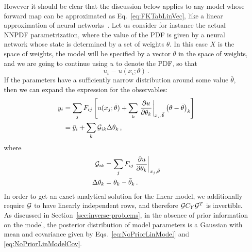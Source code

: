 However it should be clear that the discussion below applies to any model whose forward 
map can be approximated as Eq.~\eqref{eq:FKTabLinVec}, like a linear approximation of neural
networks~\cite{ADVANI2020428}. Let us consider for instance the actual NNPDF parametrization, 
where the value of the PDF is given by a neural network whose state is determined by a set of 
weights $\theta$. In this case $X$ is the space of weights, the model will be specified by a vector 
$\theta$ in the space of weights, and we are going to continue using $u$ to denote the PDF, so that 
\begin{equation}
    \label{eq:WeightsParam}
    u_i = u(x_i; \theta)\, .
\end{equation}
If the parameters have a sufficiently narrow distribution around some value $\bar\theta$, then
we can expand the expression for the observables:
\begin{align}
    y_i  &= 
        \sum_j F_{ij} \left[u(x_j; \bar\theta)
         + \sum_k \left.\frac{\partial u}{\partial \theta_k}\right|_{x_j,\bar\theta} 
         \left(\theta - \bar\theta\right)_k
        \right] \\
        &=
        \bar{y}_i  + \sum_k \mathcal{G}_{ik} \Delta\theta_k
        \,,         
\end{align}
where 
\begin{align}
    \mathcal{G}_{ik} &= 
        \sum_j F_{ij} \left.\frac{\partial u}{\partial \theta_k}\right|_{x_j,\bar\theta} \\
    \Delta\theta_k &= \theta_k - \bar\theta_k\, .
\end{align}
In order to get an exact analytical solution for
the linear model, we additionally require $\mathcal{G}$ to have linearly independent
rows, and therefore $\mathcal{G} C_{Y} \mathcal{G}^T$ is invertible. As discussed in 
Section~\ref{sec:inverse-problems}, in the absence of 
prior information on the model, the posterior distribution of model parameters
is a Gaussian with mean and covariance given by Eqs.~\ref{eq:NoPriorLinModel}
and \ref{eq:NoPriorLinModelCov}.

